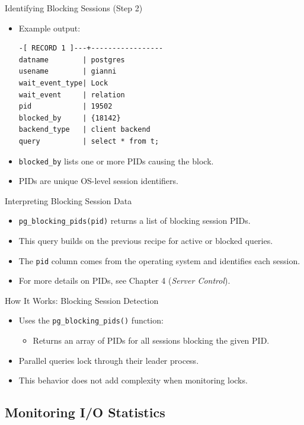 \documentclass[aspectratio=169]{beamer}
\begin{document}
\begin{frame}[fragile]{Identifying Blocking Sessions (Step 2)}
\begin{itemize}
    \item Example output:
\begin{verbatim}
-[ RECORD 1 ]---+-----------------
datname        | postgres
usename        | gianni
wait_event_type| Lock
wait_event     | relation
pid            | 19502
blocked_by     | {18142}
backend_type   | client backend
query          | select * from t;
\end{verbatim}
    \item \texttt{blocked\_by} lists one or more PIDs causing the block.
    \item PIDs are unique OS-level session identifiers.
\end{itemize}
\end{frame}

\begin{frame}{Interpreting Blocking Session Data}
\begin{itemize}
    \item \texttt{pg\_blocking\_pids(pid)} returns a list of blocking session PIDs.
    \item This query builds on the previous recipe for active or blocked queries.
    \item The \texttt{pid} column comes from the operating system and identifies each session.
    \item For more details on PIDs, see Chapter 4 (\textit{Server Control}).
\end{itemize}
\end{frame}

\begin{frame}{How It Works: Blocking Session Detection}
\begin{itemize}
    \item Uses the \texttt{pg\_blocking\_pids()} function:
    \begin{itemize}
        \item Returns an array of PIDs for all sessions blocking the given PID.
    \end{itemize}
    \item Parallel queries lock through their leader process.
    \item This behavior does not add complexity when monitoring locks.
\end{itemize}
\end{frame}

\subsection{Monitoring I/O Statistics}
\end{document}
